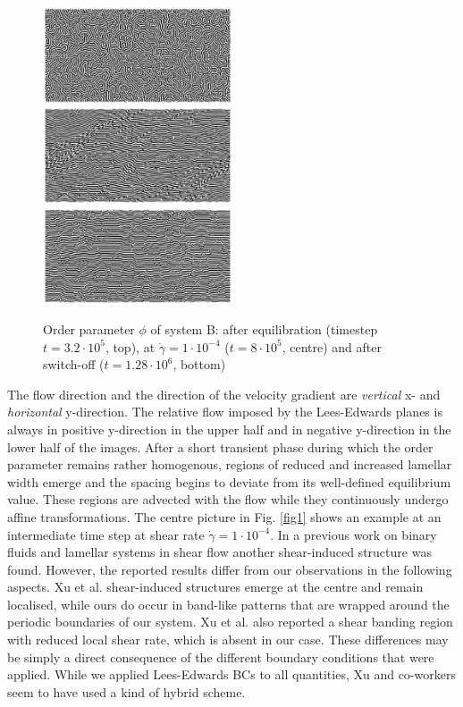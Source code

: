 \documentclass[8.5pt,twoside,twocolumn]{article}
\newcommand{\e}[1]{\cdot10^{#1}}
\newcommand{\gd}{\dot{\gamma}}
\begin{document}
\begin{figure}[htp]
\centering
\includegraphics[angle=0,width=0.5\textwidth]{phi_run707_320.jpg}\\
\includegraphics[angle=0,width=0.5\textwidth]{phi_run710_800.jpg}\\
\includegraphics[angle=0,width=0.5\textwidth]{phi_run765_1280.jpg}
\caption{Order parameter $\phi$ of system B: after equilibration (timestep $t=3.2\e{5}$, top), at $\dot{\gamma}=1\cdot10^{-4}$ ($t=8\e{5}$, centre) and after switch-off ($t=1.28\e{6}$, bottom)}
\label{fig2}
\end{figure}

The flow direction and the direction of the velocity gradient are {\it vertical} x- and {\it horizontal} y-direction.
The relative flow imposed by the Lees-Edwards planes is always in positive y-direction in the upper half and in negative y-direction in the lower half of the images.
After a short transient phase during which the order parameter remains rather homogenous, regions of reduced and increased lamellar width emerge and the spacing begins to deviate from its well-defined equilibrium value.
These regions are advected with the flow while they continuously undergo affine transformations.
The centre picture in Fig. \ref{fig1} shows an example at an intermediate time step at shear rate $\gd= 1\e{-4}$.
In a previous work on binary fluids and lamellar systems in shear flow \cite{Xu06b} another shear-induced structure was found.
However, the reported results differ from our observations in the following aspects.
Xu et al. shear-induced structures emerge at the centre and remain localised, while ours do occur in band-like patterns that are wrapped around the periodic boundaries of our system.
Xu et al. also reported a shear banding region with reduced local shear rate, which is absent in our case.
These differences may be simply a direct consequence of the different boundary conditions that were applied.
While we applied Lees-Edwards BCs to all quantities, Xu and co-workers seem to have used a kind of hybrid scheme.
\end{document}
